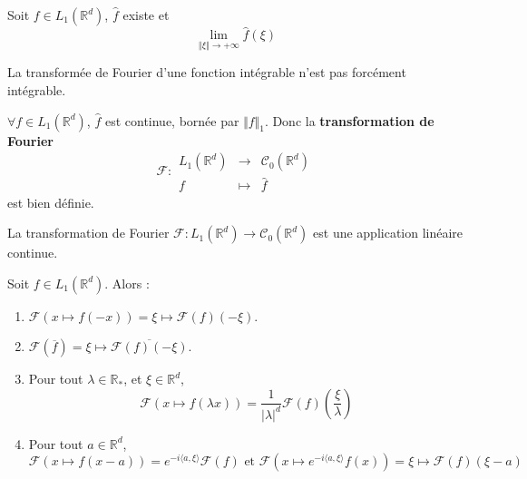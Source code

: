   \begin{lemma}
    Soit $f \in L_1(\mathbb{R}^d)$, $\widehat{f}$ existe et
    \[ \lim_{\Vert \xi \Vert \rightarrow +\infty} \widehat{f}(\xi) \]
  \end{lemma}

  \begin{remark}
    La transformée de Fourier d'une fonction intégrable n'est pas forcément intégrable.
  \end{remark}

  \begin{theorem}
    $\forall f \in L_1(\mathbb{R}^d)$, $\widehat{f}$ est continue, bornée par $\Vert f \Vert_1$. Donc la \textbf{transformation de Fourier}
    \[
    \mathcal{F} :
    \begin{array}{ccc}
      L_1(\mathbb{R}^d) &\rightarrow& \mathcal{C}_0(\mathbb{R}^d) \\
      f &\mapsto& \widehat{f}
    \end{array}
    \]
    est bien définie.
  \end{theorem}

  \begin{corollary}
    La transformation de Fourier $\mathcal{F} : L_1(\mathbb{R}^d) \rightarrow \mathcal{C}_0(\mathbb{R}^d)$ est une application linéaire continue.
  \end{corollary}

  \begin{proposition}
    Soit $f \in L_1(\mathbb{R}^d)$. Alors :
    \begin{enumerate}[label=(\roman*)]
      \item $\mathcal{F}(x \mapsto f(-x)) = \xi \mapsto \mathcal{F}(f)(-\xi)$.
      \item $\mathcal{F}(\overline{f}) = \xi \mapsto \overline{\mathcal{F}(f)(-\xi)}$.
      \item Pour tout $\lambda \in \mathbb{R}_*$, et $\xi \in \mathbb{R}^d$,
      \[ \mathcal{F}(x \mapsto f(\lambda x)) = \frac{1}{\vert \lambda \vert^d} \mathcal{F}(f) \left( \frac{\xi}{\lambda} \right) \]
      \item Pour tout $a \in \mathbb{R}^d$,
      \[ \mathcal{F}(x \mapsto f(x - a)) = e^{-i \langle a, \xi \rangle} \mathcal{F}(f) \text{ et } \mathcal{F}(x \mapsto e^{-i \langle a, \xi \rangle} f(x)) = \xi \mapsto \mathcal{F}(f)(\xi - a) \]
    \end{enumerate}
  \end{proposition}


